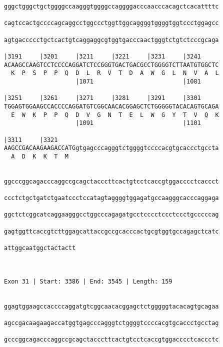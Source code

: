 \documentclass{article}
\begin{document}
\begin{Verbatim}
gggctgggctgctggggccaagggtggggccaggggacccaacccacagctcacattttc
                                                            
cagtccactgccccagcaggcctggccctggttggcaggggtggggtggtccctggagcc
                                                            
agtgaccccctgctcactgtcaggaggcgtggtgacccaactgggtctgtctcccgcaga
                                                            
|3191     |3201     |3211     |3221     |3231     |3241     
ACAAGCCAAGTCCTCCCCAGGATCTCCGGGTGACTGACGCCTGGGGTCTTAATGTGGCTC
  K  P  S  P  P  Q  D  L  R  V  T  D  A  W  G  L  N  V  A  L
                    |1071                         |1081     
  
|3251     |3261     |3271     |3281     |3291     |3301     
TGGAGTGGAAGCCACCCCAGGATGTCGGCAACACGGAGCTCTGGGGGTACACAGTGCAGA
  E  W  K  P  P  Q  D  V  G  N  T  E  L  W  G  Y  T  V  Q  K
                    |1091                         |1101     
  
|3311     |3321                                             
AAGCCGACAAGAAGACCATGgtgagcccagggtctggggtccccacgtgcaccctgccta
  A  D  K  K  T  M                                          
                                                            
  
ggcccggcagacccaggccgcagctacccttcactgtcctcaccgtggacccctcaccct
                                                            
ccctctgctgatctgaatccctccatagtaggggtggagatgccaagggcacccaggaga
                                                            
ggctctcggcatcaggaagggcctggcccagagatgcctcccctccctccctgcccccag
                                                            
gagtggttcaccgtcttggagcattaccgccgcacccactgcgtggtgccagagctcatc
                                                            
attggcaatggctactactt
                    
                    
 
Exon 31 | Start: 3386 | End: 3545 | Length: 159


ggagtggaagccaccccaggatgtcggcaacacggagctctgggggtacacagtgcagaa
                                                            
agccgacaagaagaccatggtgagcccagggtctggggtccccacgtgcaccctgcctag
                                                            
gcccggcagacccaggccgcagctacccttcactgtcctcaccgtggacccctcaccctc
                                                            

\end{Verbatim}
\end{document}
